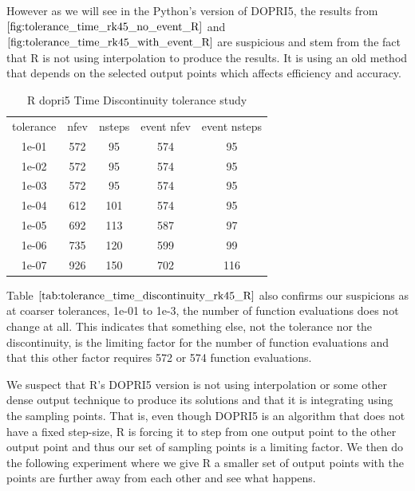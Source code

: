 However as we will see in the Python's version of DOPRI5, the results from $\ref{fig:tolerance_time_rk45_no_event_R}$ and $\ref{fig:tolerance_time_rk45_with_event_R}$ are suspicious and stem from the fact that R is not using interpolation to produce the results. It is using an old method that depends on the selected output points which affects efficiency and accuracy.


\begin{table}[h]
\caption {R dopri5 Time Discontinuity tolerance study} \label{tab:tolerance_time_discontinuity_rk45_R} 
\begin{center}
\begin{tabular}{ c c c c c }
tolerance & nfev & nsteps & event nfev & event nsteps \\ 
1e-01 & 572 &  95 & 574 &  95 \\
1e-02 & 572 &  95 & 574 &  95 \\
1e-03 & 572 &  95 & 574 &  95 \\
1e-04 & 612 & 101 & 574 &  95 \\
1e-05 & 692 & 113 & 587 &  97 \\
1e-06 & 735 & 120 & 599 &  99 \\
1e-07 & 926 & 150 & 702 & 116 \\
\end{tabular}
\end{center}
\end{table}

Table $\ref{tab:tolerance_time_discontinuity_rk45_R}$ also confirms our suspicions as at coarser tolerances, 1e-01 to 1e-3, the number of function evaluations does not change at all. This indicates that something else, not the tolerance nor the discontinuity, is the limiting factor for the number of function evaluations and that this other factor requires 572 or 574 function evaluations.

We suspect that R's DOPRI5 version is not using interpolation or some other dense output technique to produce its solutions and that it is integrating using the sampling points. That is, even though DOPRI5 is an algorithm that does not have a fixed step-size, R is forcing it to step from one output point to the other output point and thus our set of sampling points is a limiting factor. We then do the following experiment where we give R a smaller set of output points with the points are further away from each other and see what happens.

